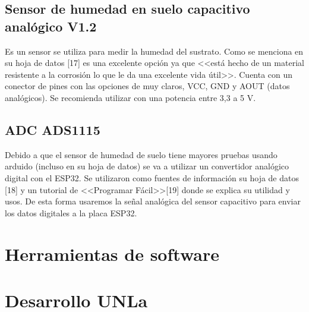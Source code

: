 \subsection{Sensor de humedad en suelo capacitivo analógico V1.2}
Es un sensor se utiliza para medir la humedad del sustrato. Como se menciona en su hoja de datos [17] es una excelente opción ya que <<está hecho de un material resistente a la corrosión lo que le da una excelente vida útil>>. Cuenta con un conector de pines con las opciones de muy claros, VCC, GND y AOUT (datos analógicos). Se recomienda utilizar con una potencia entre 3,3 a 5 V.

\subsection{ADC ADS1115}
Debido a que el sensor de humedad de suelo tiene mayores pruebas usando arduido (incluso en su hoja de datos) se va a utilizar un convertidor analógico digital con el ESP32. Se utilizaron como fuentes de información su hoja de datos [18] y un tutorial de <<Programar Fácil>>[19] donde se explica su utilidad y usos. De esta forma usaremos la señal analógica del sensor capacitivo para enviar los datos digitales a la placa ESP32.


\section{Herramientas de software}


\section{Desarrollo UNLa}

